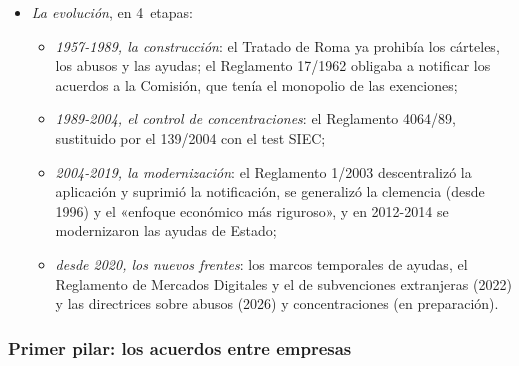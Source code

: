 \documentclass[11pt]{article}
\begin{document}
\begin{itemize}
\item \emph{La evolución}, en 4~etapas:
  \begin{itemize}
  \item \emph{1957-1989, la construcción}: el Tratado de Roma ya prohibía los cárteles, los abusos y las ayudas; el Reglamento 17/1962 obligaba a notificar los acuerdos a la Comisión, que tenía el monopolio de las exenciones;
  \item \emph{1989-2004, el control de concentraciones}: el Reglamento 4064/89, sustituido por el 139/2004 con el test SIEC;
  \item \emph{2004-2019, la modernización}: el Reglamento 1/2003 descentralizó la aplicación y suprimió la notificación, se generalizó la clemencia (desde 1996) y el «enfoque económico más riguroso», y en 2012-2014 se modernizaron las ayudas de Estado;
  \item \emph{desde 2020, los nuevos frentes}: los marcos temporales de ayudas, el Reglamento de Mercados Digitales y el de subvenciones extranjeras (2022) y las directrices sobre abusos (2026) y concentraciones (en preparación).
  \end{itemize}
\end{itemize}

\begin{infografia}[H]
\centering
\caption{Los pilares de la política de competencia de la Unión Europea}\label{figu:pilares}
\end{infografia}

\subsubsection{Primer pilar: los acuerdos entre empresas}\label{sec:acuerdos}
\end{document}
